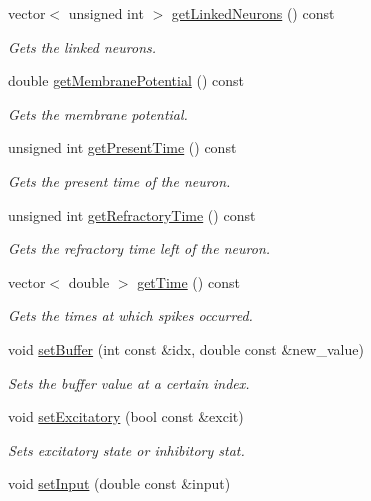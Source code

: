 \begin{DoxyCompactItemize}
vector$<$ unsigned int $>$ \hyperlink{classNeuron_a3495ab6e72f3f2e74fe4e0396400f0e4}{get\-Linked\-Neurons} () const 
\begin{DoxyCompactList}\small\item\em Gets the linked neurons. \end{DoxyCompactList}\item 
double \hyperlink{classNeuron_a86341dee7a81765fe4840777a008c688}{get\-Membrane\-Potential} () const 
\begin{DoxyCompactList}\small\item\em Gets the membrane potential. \end{DoxyCompactList}\item 
unsigned int \hyperlink{classNeuron_a794164b45de932a0b65cc65002bb579f}{get\-Present\-Time} () const 
\begin{DoxyCompactList}\small\item\em Gets the present time of the neuron. \end{DoxyCompactList}\item 
unsigned int \hyperlink{classNeuron_a814e22e430a10855beac8a285b674957}{get\-Refractory\-Time} () const 
\begin{DoxyCompactList}\small\item\em Gets the refractory time left of the neuron. \end{DoxyCompactList}\item 
vector$<$ double $>$ \hyperlink{classNeuron_a9c4fb30247f30a3cbb8fc1e93a3f06d2}{get\-Time} () const 
\begin{DoxyCompactList}\small\item\em Gets the times at which spikes occurred. \end{DoxyCompactList}\item 
void \hyperlink{classNeuron_af1c7208a3e5b06a8aa0019ebd0418c2c}{set\-Buffer} (int const \&idx, double const \&new\-\_\-value)
\begin{DoxyCompactList}\small\item\em Sets the buffer value at a certain index. \end{DoxyCompactList}\item 
void \hyperlink{classNeuron_a9fa17ac0c2a7de0a19cc514e235d7762}{set\-Excitatory} (bool const \&excit)
\begin{DoxyCompactList}\small\item\em Sets excitatory state or inhibitory stat. \end{DoxyCompactList}\item 
void \hyperlink{classNeuron_a63412f798c2ef1c8c41199b61b3c3d9a}{set\-Input} (double const \&input)

\end{DoxyCompactItemize}
